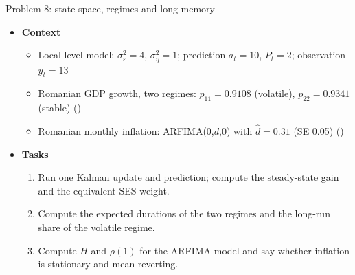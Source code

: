 \begin{frame}{Problem 8: state space, regimes and long memory}
\itemsize{\footnotesize}
\begin{itemize}
    \item \textbf{Context}
    \begin{itemize}
        \item Local level model: $\sigma^2_\varepsilon = 4$, $\sigma^2_\eta = 1$; prediction $a_t = 10$, $P_t = 2$; observation $y_t = 13$
        \item Romanian GDP growth, two regimes: $p_{11} = 0.9108$ (volatile), $p_{22} = 0.9341$ (stable) ()
        \item Romanian monthly inflation: ARFIMA(0,$d$,0) with $\hat d = 0.31$ (SE 0.05) ()
    \end{itemize}
    \item \textbf{Tasks}
\begin{enumerate}
    \item Run one Kalman update and prediction; compute the steady-state gain and the equivalent SES weight.
    \item Compute the expected durations of the two regimes and the long-run share of the volatile regime.
    \item Compute $H$ and $\rho(1)$ for the ARFIMA model and say whether inflation is stationary and mean-reverting.
\end{enumerate}
\end{itemize}
\end{frame}

